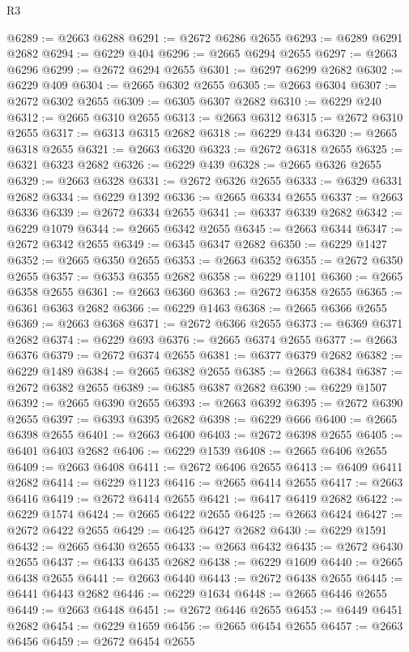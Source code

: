 \begin{lexlean}{R3}
\begin{coremodule}
@6289 := @2663 @6288
@6291 := @2672 @6286 @2655
@6293 := @6289 @6291 @2682
@6294 := @6229 @404
@6296 := @2665 @6294 @2655
@6297 := @2663 @6296
@6299 := @2672 @6294 @2655
@6301 := @6297 @6299 @2682
@6302 := @6229 @409
@6304 := @2665 @6302 @2655
@6305 := @2663 @6304
@6307 := @2672 @6302 @2655
@6309 := @6305 @6307 @2682
@6310 := @6229 @240
@6312 := @2665 @6310 @2655
@6313 := @2663 @6312
@6315 := @2672 @6310 @2655
@6317 := @6313 @6315 @2682
@6318 := @6229 @434
@6320 := @2665 @6318 @2655
@6321 := @2663 @6320
@6323 := @2672 @6318 @2655
@6325 := @6321 @6323 @2682
@6326 := @6229 @439
@6328 := @2665 @6326 @2655
@6329 := @2663 @6328
@6331 := @2672 @6326 @2655
@6333 := @6329 @6331 @2682
@6334 := @6229 @1392
@6336 := @2665 @6334 @2655
@6337 := @2663 @6336
@6339 := @2672 @6334 @2655
@6341 := @6337 @6339 @2682
@6342 := @6229 @1079
@6344 := @2665 @6342 @2655
@6345 := @2663 @6344
@6347 := @2672 @6342 @2655
@6349 := @6345 @6347 @2682
@6350 := @6229 @1427
@6352 := @2665 @6350 @2655
@6353 := @2663 @6352
@6355 := @2672 @6350 @2655
@6357 := @6353 @6355 @2682
@6358 := @6229 @1101
@6360 := @2665 @6358 @2655
@6361 := @2663 @6360
@6363 := @2672 @6358 @2655
@6365 := @6361 @6363 @2682
@6366 := @6229 @1463
@6368 := @2665 @6366 @2655
@6369 := @2663 @6368
@6371 := @2672 @6366 @2655
@6373 := @6369 @6371 @2682
@6374 := @6229 @693
@6376 := @2665 @6374 @2655
@6377 := @2663 @6376
@6379 := @2672 @6374 @2655
@6381 := @6377 @6379 @2682
@6382 := @6229 @1489
@6384 := @2665 @6382 @2655
@6385 := @2663 @6384
@6387 := @2672 @6382 @2655
@6389 := @6385 @6387 @2682
@6390 := @6229 @1507
@6392 := @2665 @6390 @2655
@6393 := @2663 @6392
@6395 := @2672 @6390 @2655
@6397 := @6393 @6395 @2682
@6398 := @6229 @666
@6400 := @2665 @6398 @2655
@6401 := @2663 @6400
@6403 := @2672 @6398 @2655
@6405 := @6401 @6403 @2682
@6406 := @6229 @1539
@6408 := @2665 @6406 @2655
@6409 := @2663 @6408
@6411 := @2672 @6406 @2655
@6413 := @6409 @6411 @2682
@6414 := @6229 @1123
@6416 := @2665 @6414 @2655
@6417 := @2663 @6416
@6419 := @2672 @6414 @2655
@6421 := @6417 @6419 @2682
@6422 := @6229 @1574
@6424 := @2665 @6422 @2655
@6425 := @2663 @6424
@6427 := @2672 @6422 @2655
@6429 := @6425 @6427 @2682
@6430 := @6229 @1591
@6432 := @2665 @6430 @2655
@6433 := @2663 @6432
@6435 := @2672 @6430 @2655
@6437 := @6433 @6435 @2682
@6438 := @6229 @1609
@6440 := @2665 @6438 @2655
@6441 := @2663 @6440
@6443 := @2672 @6438 @2655
@6445 := @6441 @6443 @2682
@6446 := @6229 @1634
@6448 := @2665 @6446 @2655
@6449 := @2663 @6448
@6451 := @2672 @6446 @2655
@6453 := @6449 @6451 @2682
@6454 := @6229 @1659
@6456 := @2665 @6454 @2655
@6457 := @2663 @6456
@6459 := @2672 @6454 @2655

\end{coremodule}
\end{lexlean}
